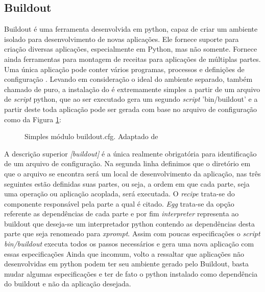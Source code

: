 \subsection{Buildout}
Buildout é uma ferramenta desenvolvida em python, capaz de criar um ambiente isolado para desenvolvimento de novas aplicações. Ele fornece suporte para criação diversas aplicações, especialmente em Python, mas não somente. Fornece ainda ferramentas para montagem de receitas para aplicações de múltiplas partes. Uma única aplicação pode conter vários programas, processos e definições de configuração \cite{Brandon 2008}.
Levando em consideração o ideal do ambiente separado, também chamado de puro, a instalação do  é extremamente simples a partir de um arquivo de \textit{script} python, que ao ser executado gera um segundo \textit{script} 'bin/buildout' e a partir deste toda aplicação pode ser gerada com base no arquivo de configuração como da Figura \ref{buildout}:
\begin{figure}[ht]
    \centering
    \caption{Simples módulo buildout.cfg. Adaptado de \cite{Zope Foundation Buildout}}
    \label{buildout}
\end{figure}
A descrição superior \textit{[buildout]} é a única realmente obrigatória para identificação de um arquivo de configuração. Na segunda linha definimos que o diretório em que o arquivo se encontra será um local de desenvolvimento da aplicação, nas três seguintes estão definidas suas partes, ou seja, a ordem em que cada parte, seja uma operação ou aplicação acoplada, será executada.
O \textit{recipe} trata-se do componente responsável pela parte a qual é citado. \textit{Egg} trata-se da opção referente as dependências de cada parte e por fim \textit{interpreter}  representa ao buildout que deseja-se um interpretador python contendo as dependências desta parte que seja renomeado para \textit{xprompt}.
Assim com poucas especificações o \textit{script} \textit{bin/buildout} executa todos os passos necessários e gera uma nova aplicação com essas especificações 
Ainda que incomum, volto a ressaltar que aplicações não desenvolvidas em python podem ter seu ambiente gerado pelo Buildout, basta mudar algumas especificações e ter de fato o python instalado como dependência do buildout e não da aplicação desejada.

